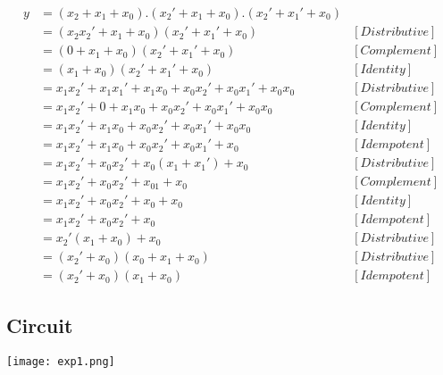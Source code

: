 \documentclass[12pt,a4paper]{report}
\begin{document}
\begin{align*}
	y & = (x_2 + x_1 + x_0).(x_2' + x_1 + x_0).(x_2' + x_1' + x_0) \\
	& = (x_2x_2' + x_1 + x_0)(x_2' + x_1' + x_0) &[Distributive] \\
	& = (0 + x_1 + x_0)(x_2' + x_1' + x_0) &[Complement]\\
	& = (x_1 + x_0)(x_2' + x_1' + x_0) &[Identity]\\
	& = x_1x_2' + x_1x_1' + x_1x_0 + x_0x_2' + x_0x_1' + x_0x_0 &[Distributive]\\
	& = x_1x_2' + 0 + x_1x_0 + x_0x_2' + x_0x_1' + x_0x_0 &[Complement]\\
	& = x_1x_2' + x_1x_0 + x_0x_2' + x_0x_1' + x_0x_0 &[Identity]\\
	& = x_1x_2' + x_1x_0 + x_0x_2' + x_0x_1' + x_0 &[Idempotent]\\
	& = x_1x_2' + x_0x_2' + x_0(x_1 + x_1') + x_0 &[Distributive]\\
	& = x_1x_2' + x_0x_2' + x_01 + x_0 &[Complement]\\
	& = x_1x_2' + x_0x_2' + x_0 + x_0 &[Identity]\\
	& = x_1x_2' + x_0x_2' + x_0 &[Idempotent]\\
	& = x_2'(x_1 + x_0) + x_0 &[Distributive]\\
	& = (x_2' + x_0)(x_0 + x_1 + x_0) &[Distributive]\\
	& = (x_2' + x_0)(x_1 + x_0)&[Idempotent]
\end{align*}

\subsection*{Circuit}
\texttt{[image: exp1.png]}
\end{document}
